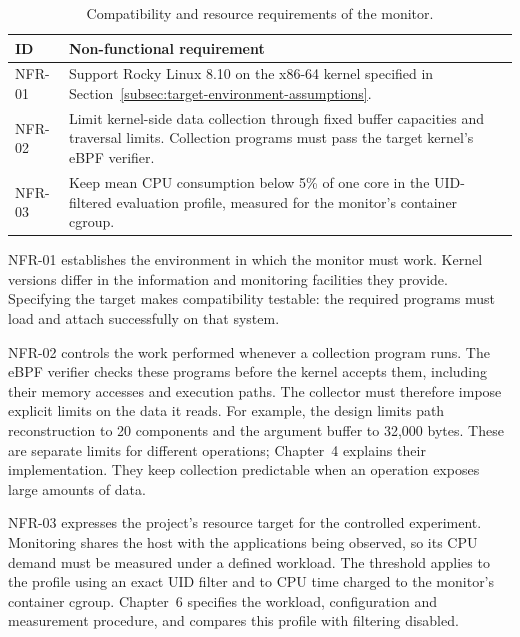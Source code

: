 \begin{table}[H]
      \centering
      \small
      \renewcommand{\arraystretch}{1.18}
      \begin{tabularx}{\textwidth}{
          @{}
          >{\raggedright\arraybackslash}p{}
          >{\raggedright\arraybackslash}X
          @{}
      }
          \toprule
          \textbf{ID} & \textbf{Non-functional requirement} \\
          \midrule

          NFR-01 &
          Support Rocky Linux 8.10 on the x86-64 kernel specified in
          Section~\ref{subsec:target-environment-assumptions}. \\

          NFR-02 &
          Limit kernel-side data collection through fixed buffer capacities
          and traversal limits. Collection programs must pass the target
          kernel's eBPF verifier. \\

          NFR-03 &
          Keep mean CPU consumption below 5\% of one core in the
          UID-filtered evaluation profile, measured for the monitor's
          container cgroup. \\

          \bottomrule
      \end{tabularx}
      \caption{Compatibility and resource requirements of the monitor.}
      \label{tab:nonfunctional-requirements}
  \end{table}

NFR-01 establishes the environment in which the monitor must work.
Kernel versions differ in the information and monitoring facilities they
provide. Specifying the target makes compatibility testable: the required
programs must load and attach successfully on that system.

NFR-02 controls the work performed whenever a collection program runs.
The eBPF verifier checks these programs before the kernel accepts them,
including their memory accesses and execution paths. The collector must
therefore impose explicit limits on the data it reads. For example, the
design limits path reconstruction to 20 components and the argument buffer
to 32,000 bytes. These are separate limits for different operations;
Chapter~4 explains their implementation. They keep collection predictable
when an operation exposes large amounts of data.

NFR-03 expresses the project's resource target for the controlled
experiment. Monitoring shares the host with the applications being observed,
so its CPU demand must be measured under a defined workload. The threshold
applies to the profile using an exact UID filter and to CPU time charged to
the monitor's container cgroup. Chapter~6 specifies the workload,
configuration and measurement procedure, and compares this profile with
filtering disabled.

